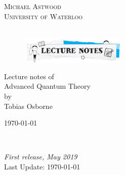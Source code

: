 \begin{titlepage}
	\centering\bfseries
	
	\Large \textsc{Michael Astwood}%
	\\[2ex]
	\large\textsc{University of Waterloo}\\
	\small\textsc{}\\
	\begin{figure}[htbp]
		\centering
		\includegraphics[width=0.45\textwidth]{ln.jpg}
	\end{figure}
	
	
	\Large Lecture notes of\\[2ex]
	\Huge Advanced Quantum Theory\\[2ex]
	\Large by\\[2ex]
	\Large Tobias Osborne
	
	\large \today
	
\end{titlepage}

\newpage

~\vfill
\thispagestyle{empty}

\noindent \textit{First release, May 2019}\\ %
\noindent Last Update: \today


%
